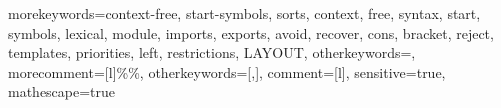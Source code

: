  {
	morekeywords={context-free, start-symbols, sorts, context, free, syntax, start,
	symbols, lexical, module, imports, exports, avoid, recover, cons, bracket,
	reject, templates, priorities, left, restrictions, LAYOUT}, 
	otherkeywords={}, 
	morecomment=[l]{\%\%},	
	otherkeywords={[,]},  
	comment=[l]{\/\/},
	sensitive=true,
	mathescape=true
}

\newcommand{\sdfcode}[1]{\lstinline[language=SDF,basicstyle=\lstinlinestyle,breaklines=false]{#1}}
\newcommand{\sdfcodebl}[1]{\lstinline[language=SDF,basicstyle=\lstinlinestyle,breaklines=true]{#1}}
\newcommand{\SDF}{\langname{SDF}}
